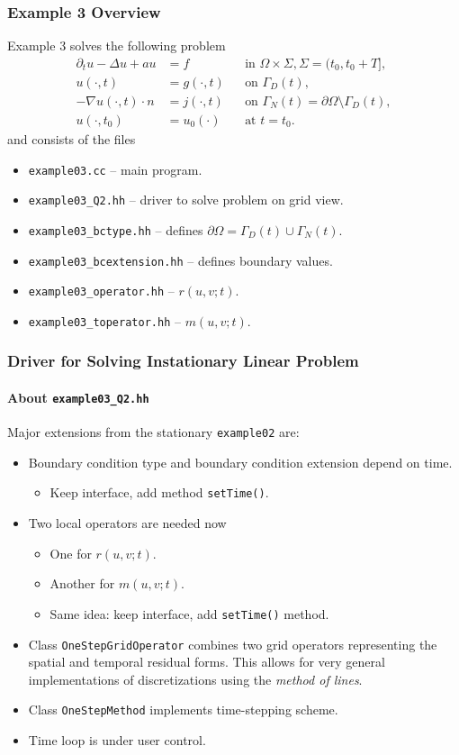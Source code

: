 \begin{frame}
\frametitle{Example 3 Overview}
Example 3 solves the following problem
\begin{subequations} 
\begin{align*}
\partial_t u -\Delta u + a u &= f &&\text{in $\Omega\times\Sigma$}, \Sigma=(t_0,t_0+T],\\
u(\cdot,t) &= g(\cdot,t) && \text{on $\Gamma_D(t)$},\\ 
-\nabla u(\cdot,t) \cdot n &= j(\cdot,t) &&\text{on $\Gamma_N(t)=\partial\Omega\setminus\Gamma_D(t)$},\\
u(\cdot,t_0) &= u_0(\cdot) && \text{at $t=t_0$}.
\end{align*}
\end{subequations}
and consists of the files
\begin{itemize}
\item \lstinline{example03.cc} -- main program.
\item \lstinline{example03_Q2.hh} -- driver to solve problem on grid view.
\item \lstinline{example03_bctype.hh} -- defines $\partial\Omega = \Gamma_D(t) \cup \Gamma_N(t)$.
\item \lstinline{example03_bcextension.hh} -- defines boundary values.
\item \lstinline{example03_operator.hh} -- $r(u,v;t)$.
\item \lstinline{example03_toperator.hh} -- $m(u,v;t)$.
\end{itemize}
\end{frame}

\begin{frame}
\frametitle{Driver for Solving Instationary Linear Problem}
\framesubtitle{About \lstinline{example03_Q2.hh}}
Major extensions from the stationary \lstinline{example02} are:
\begin{itemize}
\item Boundary condition type and boundary condition extension depend on time.
\begin{itemize}
\item Keep interface, add method \lstinline{setTime()}.
\end{itemize}
\item Two local operators are needed now
\begin{itemize}
\item One for $r(u,v;t)$.
\item Another for $m(u,v;t)$.
\item Same idea: keep interface, add \lstinline{setTime()} method.
\end{itemize}
\item Class \lstinline{OneStepGridOperator} combines two grid
  operators representing the spatial and temporal residual forms. This allows for very general
  implementations of discretizations using the \textit{method of
    lines}.
\item Class \lstinline{OneStepMethod} implements time-stepping scheme.
\item Time loop is under user control.
\end{itemize}
\end{frame}

